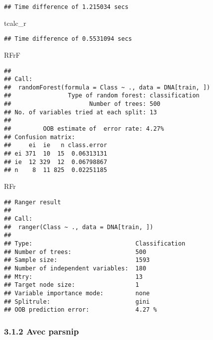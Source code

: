 \documentclass[]{article}
\newenvironment{Shaded}{\begin{snugshade}}{\end{snugshade}}
\newcommand{\NormalTok}[1]{#1}
\begin{document}
\begin{verbatim}
## Time difference of 1.215034 secs
\end{verbatim}

\begin{Shaded}
\begin{Highlighting}[]
\NormalTok{tcalc\_r}
\end{Highlighting}
\end{Shaded}

\begin{verbatim}
## Time difference of 0.5531094 secs
\end{verbatim}

\begin{Shaded}
\begin{Highlighting}[]
\NormalTok{RFrF}
\end{Highlighting}
\end{Shaded}

\begin{verbatim}
## 
## Call:
##  randomForest(formula = Class ~ ., data = DNA[train, ]) 
##                Type of random forest: classification
##                      Number of trees: 500
## No. of variables tried at each split: 13
## 
##         OOB estimate of  error rate: 4.27%
## Confusion matrix:
##     ei  ie   n class.error
## ei 371  10  15  0.06313131
## ie  12 329  12  0.06798867
## n    8  11 825  0.02251185
\end{verbatim}

\begin{Shaded}
\begin{Highlighting}[]
\NormalTok{RFr}
\end{Highlighting}
\end{Shaded}

\begin{verbatim}
## Ranger result
## 
## Call:
##  ranger(Class ~ ., data = DNA[train, ]) 
## 
## Type:                             Classification 
## Number of trees:                  500 
## Sample size:                      1593 
## Number of independent variables:  180 
## Mtry:                             13 
## Target node size:                 1 
## Variable importance mode:         none 
## Splitrule:                        gini 
## OOB prediction error:             4.27 %
\end{verbatim}

\hypertarget{avec-parsnip}{%
\subsubsection{3.1.2 Avec parsnip}\label{avec-parsnip}}
\end{document}
